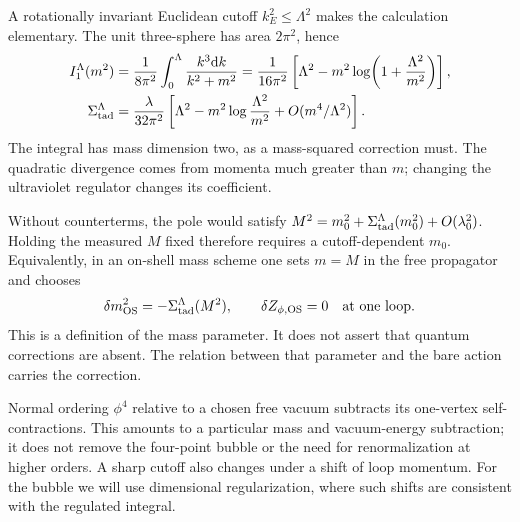 \documentclass[11pt]{article}
\newcommand{\dd}{\mathrm d}
\begin{document}
A rotationally invariant Euclidean cutoff \(k_E^2\leq\Lambda^2\)
makes the calculation elementary. The unit three-sphere has area
\(2\pi^2\), hence
\begin{align}
 I_1^\Lambda(m^2)&=\frac{1}{8\pi^2}\int_0^\Lambda
 \frac{k^3\dd k}{k^2+m^2}
 =\frac{1}{16\pi^2}\left[\Lambda^2-m^2
 \log\!\left(1+\frac{\Lambda^2}{m^2}\right)\right],\label{eq:cutoff}\\
 \Sigma_{\rm tad}^\Lambda&=\frac{\lambda}{32\pi^2}
 \left[\Lambda^2-m^2\log\frac{\Lambda^2}{m^2}
 +O(m^4/\Lambda^2)\right].                        \label{eq:cutoffSigma}
\end{align}
The integral has mass dimension two, as a mass-squared correction
must. The quadratic divergence comes from momenta much greater than
\(m\); changing the ultraviolet regulator changes its coefficient.

Without counterterms, the pole would satisfy
\(M^2=m_0^2+\Sigma_{\rm tad}^\Lambda(m_0^2)+O(\lambda_0^2)\).
Holding the measured \(M\) fixed therefore requires a
cutoff-dependent \(m_0\). Equivalently, in an on-shell mass scheme
one sets \(m=M\) in the free propagator and chooses
\begin{equation}
 \delta m^2_{\rm OS}=-\Sigma_{\rm tad}^\Lambda(M^2),
 \qquad \delta Z_{\phi,\rm OS}=0\quad\hbox{at one loop}.
 \label{eq:OSmass}
\end{equation}
This is a definition of the mass parameter. It does not assert that
quantum corrections are absent. The relation between that parameter
and the bare action carries the correction.

\begin{remarkbox}
Normal ordering \(\phi^4\) relative to a chosen free vacuum subtracts
its one-vertex self-contractions. This amounts to a particular mass
and vacuum-energy subtraction; it does not remove the four-point
bubble or the need for renormalization at higher orders.
A sharp cutoff also changes under a shift of loop momentum. For the
bubble we will use dimensional regularization, where such shifts are
consistent with the regulated integral.
\end{remarkbox}
\end{document}
